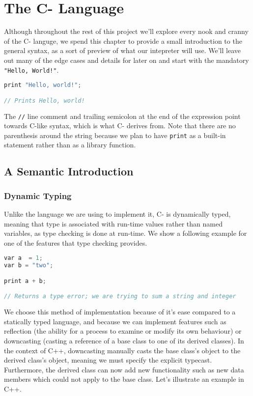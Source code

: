
\chapter{The C- Language}\label{ch:dashC}

Although throughout the rest of this project we'll explore every nook and cranny of the C- languge, we spend this chapter to provide a small introduction to the general syntax, as a sort of preview of what our intepreter will use. We'll leave out many of the edge cases and details for later on and start with the mandatory \verb+"Hello, World!"+. 

\begin{lstlisting}[language=C]
print "Hello, world!";

// Prints Hello, world!
\end{lstlisting}

The \verb+//+ line comment and trailing semicolon at the end of the expression point towards C-like syntax, which is what C- derives from. Note that there are no parenthesis around the string because we plan to have \verb+print+ as a built-in statement rather than as a library function. 

\section{A Semantic Introduction}

\subsection{Dynamic Typing}

Unlike the language we are using to implement it, C- is dynamically typed, meaning that type is associated with run-time values rather than named variables, as type checking is done at run-time. We show a following example for one of the features that type checking provides. 

\begin{lstlisting}[language=C]
var a  = 1;
var b = "two";

print a + b;

// Returns a type error; we are trying to sum a string and integer
\end{lstlisting}

We choose this method of implementation because of it's ease compared to a statically typed language, and because we can implement features such as reflection (the ability for a process to examine or modify its own behaviour) or downcasting (casting a reference of a base class to one of its derived classes). In the context of C++, downcasting manually casts the base class's object to the derived class's object, meaning we must specify the explicit typecast. Furthermore, the derived class can now add new functionality such as new data members which could not apply to the base class. Let's illustrate an example in C++.

